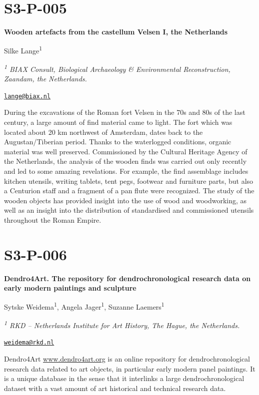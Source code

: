 \documentclass[
]{book}
\begin{document}
\hypertarget{s3-p-005}{%
\section*{S3-P-005}\label{s3-p-005}}

\textbf{Wooden artefacts from the castellum Velsen I, the Netherlands}

Silke Lange\textsuperscript{1}

\emph{\textsuperscript{1} BIAX Consult, Biological Archaeology \& Environmental Reconstruction, Zaandam, the Netherlands.}

\href{mailto:lange@biax.nl}{\nolinkurl{lange@biax.nl}}

During the excavations of the Roman fort Velsen in the 70s and 80s of the last century, a large amount of find material came to light. The fort which was located about 20 km northwest of Amsterdam, dates back to the Augustan/Tiberian period. Thanks to the waterlogged conditions, organic material was well preserved. Commissioned by the Cultural Heritage Agency of the Netherlands, the analysis of the wooden finds was carried out only recently and led to some amazing revelations. For example, the find assemblage includes kitchen utensils, writing tablets, tent pegs, footwear and furniture parts, but also a Centurion staff and a fragment of a pan flute were recognized. The study of the wooden objects has provided insight into the use of wood and woodworking, as well as an insight into the distribution of standardised and commissioned utensils throughout the Roman Empire.

\hypertarget{s3-p-006}{%
\section*{S3-P-006}\label{s3-p-006}}

\textbf{Dendro4Art. The repository for dendrochronological research data on early modern paintings and sculpture}

Sytske Weidema\textsuperscript{1}, Angela Jager\textsuperscript{1}, Suzanne Laemers\textsuperscript{1}

\emph{\textsuperscript{1} RKD -- Netherlands Institute for Art History, The Hague, the Netherlands.}

\href{mailto:weidema@rkd.nl}{\nolinkurl{weidema@rkd.nl}}

Dendro4Art \href{http://www.dendro4art.org}{www.dendro4art.org} is an online repository for dendrochronological research data related to art objects, in particular early modern panel paintings. It is a unique database in the sense that it interlinks a large dendrochronological dataset with a vast amount of art historical and technical research data.
\end{document}
